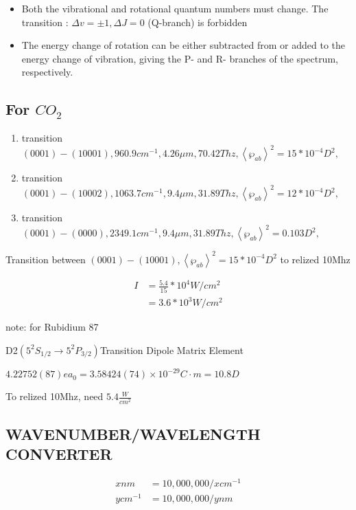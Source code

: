 \begin{itemize}
\item Both the vibrational and rotational quantum numbers must change. The transition : $\Delta v=\pm 1,\Delta J=0$ (Q-branch) is forbidden

\item The energy change of rotation can be either subtracted from or added to the energy change of vibration, giving the P- and R- branches of the spectrum, respectively.
\end{itemize}


\subsection{For $CO_{2}$}
\begin{enumerate}
\item transition $\left(0001\right)-\left(10001\right),960.9cm^{-1},4.26\mu m,70.42Thz,\left\langle \wp_{ab}\right\rangle ^{2}=15*10^{-4}D^{2},$
\item transition $\left(0001\right)-\left(10002\right),1063.7cm^{-1},9.4\mu m,31.89Thz,\left\langle \wp_{ab}\right\rangle ^{2}=12*10^{-4}D^{2},$
\item transition $\left(0001\right)-\left(0000\right),2349.1cm^{-1},9.4\mu m,31.89Thz,\left\langle \wp_{ab}\right\rangle ^{2}=0.103D^{2},$
\end{enumerate}
Transition between $\left(0001\right)-\left(10001\right),\left\langle \wp_{ab}\right\rangle ^{2}=15*10^{-4}D^{2}$
to relized 10Mhz

\begin{align*}
I & =\frac{5.4}{15}*10^{4}W/cm^{2}\\
 & =3.6*10^{3}W/cm^{2}
\end{align*}

note: for Rubidium 87

D2$\left(5^{2}S_{1/2}\rightarrow5^{2}P_{3/2}\right)$Transition Dipole
Matrix Element 

$4.22752(87)ea_{0}=3.58424(74)\times10^{-29}C\cdot m=10.8D$

To relized 10Mhz, need $5.4\frac{W}{cm^{2}}$

\subsection{WAVENUMBER/WAVELENGTH CONVERTER}

\begin{align*}
xnm & =10,000,000/xcm^{-1}\\
ycm^{-1} & =10,000,000/ynm
\end{align*}

